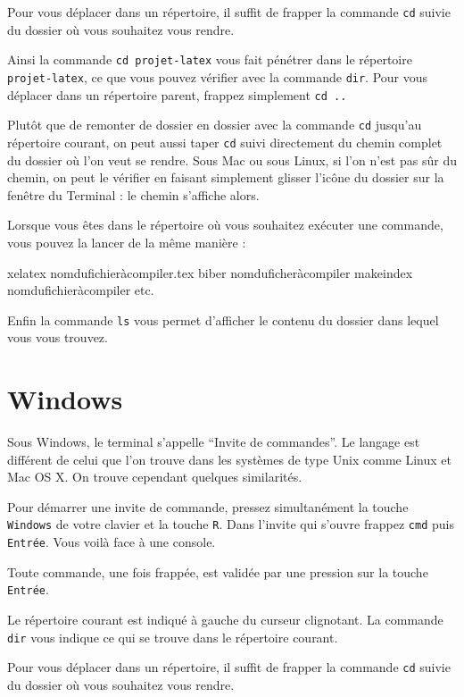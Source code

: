 Pour vous déplacer dans un répertoire, il suffit de frapper la commande
\verb|cd| suivie du dossier où vous souhaitez vous rendre.

Ainsi la commande \verb|cd projet-latex| vous fait pénétrer dans le
répertoire \verb|projet-latex|, ce que vous pouvez vérifier avec la
commande \verb|dir|. Pour vous déplacer dans un répertoire parent, frappez
simplement \verb|cd ..|

Plutôt que de remonter de dossier en dossier avec la commande \verb|cd| jusqu'au répertoire courant, on peut aussi  taper  \verb|cd| suivi directement du chemin complet du dossier où l'on veut se rendre. Sous Mac ou sous Linux, si l'on n'est pas sûr du chemin, on peut le vérifier en faisant simplement glisser l'icône du dossier sur la fenêtre du Terminal : le chemin s'affiche alors.

Lorsque vous êtes dans le répertoire où vous souhaitez exécuter une
commande, vous pouvez la lancer de la même manière :

\begin{bashcode}
xelatex nomdufichieràcompiler.tex
biber nomduficheràcompiler
makeindex nomdufichieràcompiler
etc.
\end{bashcode}

Enfin la commande \verb|ls| vous permet d'afficher le contenu du dossier dans lequel vous vous trouvez.

\section{Windows}
Sous Windows, le terminal s'appelle \enquote{Invite de commandes}. Le langage
est différent de celui que l'on trouve dans les systèmes de type Unix comme
Linux et Mac OS X. On trouve cependant quelques similarités.

Pour démarrer une invite de commande, pressez simultanément la touche \verb|Windows| de votre
clavier et la touche \verb|R|. Dans l'invite qui s'ouvre frappez \verb|cmd| puis
\verb|Entrée|. Vous voilà face à une console.

Toute commande, une fois frappée, est validée par une pression sur la touche \verb|Entrée|.

Le répertoire courant est indiqué à gauche du curseur clignotant.
La commande \verb|dir| vous indique ce qui se trouve dans le répertoire
courant.

Pour vous déplacer dans un répertoire, il suffit de frapper la commande
\verb|cd| suivie du dossier où vous souhaitez vous rendre.

